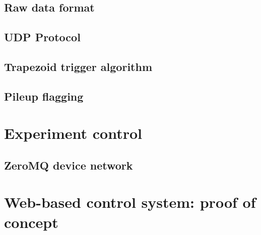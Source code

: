 

\subsection{Raw data format}



\subsection{UDP Protocol}



\subsection{Trapezoid trigger algorithm}



\subsection{Pileup flagging}



\section{Experiment control}



\subsection{ZeroMQ device network}



\section{Web-based control system: proof of concept}

